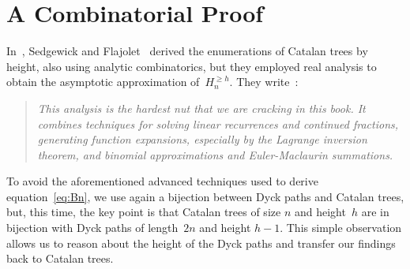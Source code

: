 \documentclass[11pt]{article}
\newcommand{\B}[2]{H_{#1}^{\geqslant #2}}
\begin{document}
\section*{A Combinatorial Proof}

In~, Sedgewick and
Flajolet~\cite{SedgewickFlajolet:1996,FlajoletSedgewick:2009} derived
the enumerations of Catalan trees by height, also using analytic
combinatorics, but they employed real analysis to obtain the
asymptotic approximation of~\(\B{n}{h}\). They
write~\cite[p.~260]{SedgewickFlajolet:1996}:
\begin{quote}
\it This analysis is the hardest nut that we are cracking in this
book. It combines techniques for solving linear recurrences and
continued fractions, generating function expansions, especially by the
Lagrange inversion theorem, and binomial approximations and
Euler\--Maclaurin summations.
\end{quote}

To avoid the aforementioned advanced techniques used to derive
equation~\eqref{eq:Bn}, we use again a bijection between Dyck paths
and Catalan trees, but, this time, the key point is that Catalan trees
of size \(n\) and height~\(h\) are in bijection with Dyck paths of
length~\(2n\) and height \(h-1\). This simple observation allows us to
reason about the height of the Dyck paths and transfer our findings
back to Catalan trees.
\end{document}
